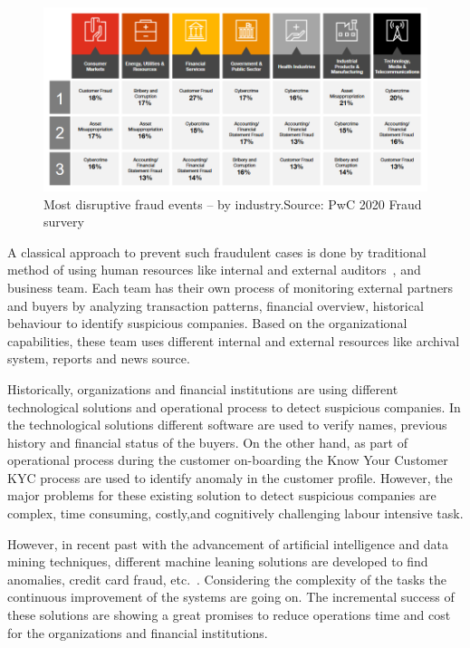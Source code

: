 \begin{figure}[htp]
    \centering
    \includegraphics[width=\linewidth]{figures/fraud_by_industry.PNG}
    \caption{Most disruptive fraud events – by industry.Source: PwC 2020 Fraud survery~\cite{PwC.Crime.Survey} }
    \label{fig:fraud_sector}
\end{figure}

A classical approach to prevent such fraudulent cases is done by traditional method of using human resources like internal and external auditors~\cite{kassem_2014}, and business team. Each team has their own process of monitoring external partners and buyers by analyzing transaction patterns, financial overview, historical behaviour to identify suspicious companies.  Based on the organizational capabilities, these team uses different internal and external resources like archival system, reports and news source.


Historically, organizations and financial institutions are using different technological solutions and operational process to detect suspicious companies. In the technological solutions different software are used to verify names, previous history and financial status of the buyers. On the other hand, as part of operational process during the customer on-boarding the Know Your Customer KYC process are used to identify anomaly in the customer profile. However, the major problems for these existing solution to detect suspicious companies are complex, time consuming, costly,and cognitively challenging labour intensive task.


However, in recent past with the advancement of artificial intelligence and data mining techniques, different machine leaning solutions are developed to find anomalies, credit card fraud, etc.~\cite{RB2021, KIRKOS2007995}. Considering the complexity of the tasks the continuous improvement of the systems are going on. The incremental success of these solutions are showing a great promises to reduce operations time and cost for the organizations and financial institutions.


